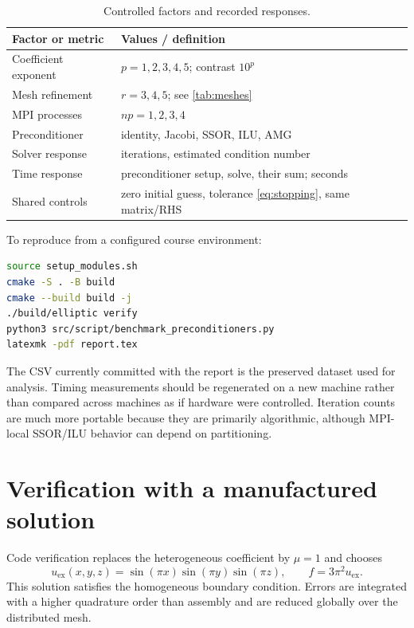 \documentclass[10pt,a4paper]{article}
\begin{document}
\begin{table}[h]
\centering
\caption{Controlled factors and recorded responses.}
\begin{tabularx}{\textwidth}{@{}lX@{}}
\toprule
Factor or metric & Values / definition\\
\midrule
Coefficient exponent & $p=1,2,3,4,5$; contrast $10^p$\\
Mesh refinement & $r=3,4,5$; see \cref{tab:meshes}\\
MPI processes & $np=1,2,3,4$\\
Preconditioner & identity, Jacobi, SSOR, ILU, AMG\\
Solver response & iterations, estimated condition number\\
Time response & preconditioner setup, solve, their sum; seconds\\
Shared controls & zero initial guess, tolerance \cref{eq:stopping}, same matrix/RHS\\
\bottomrule
\end{tabularx}
\end{table}

To reproduce from a configured course environment:
\begin{lstlisting}[language=bash]
source setup_modules.sh
cmake -S . -B build
cmake --build build -j
./build/elliptic verify
python3 src/script/benchmark_preconditioners.py
latexmk -pdf report.tex
\end{lstlisting}

The CSV currently committed with the report is the preserved dataset used for analysis. Timing
measurements should be regenerated on a new machine rather than compared across machines as if
hardware were controlled. Iteration counts are much more portable because they are primarily
algorithmic, although MPI-local SSOR/ILU behavior can depend on partitioning.

\newpage
\section{Verification with a manufactured solution}
Code verification replaces the heterogeneous coefficient by $\mu=1$ and chooses
\begin{equation}
 u_{\mathrm{ex}}(x,y,z)=\sin(\pi x)\sin(\pi y)\sin(\pi z),\qquad
 f=3\pi^2u_{\mathrm{ex}}.
\end{equation}
This solution satisfies the homogeneous boundary condition. Errors are integrated with a higher
quadrature order than assembly and are reduced globally over the distributed mesh.
\end{document}
